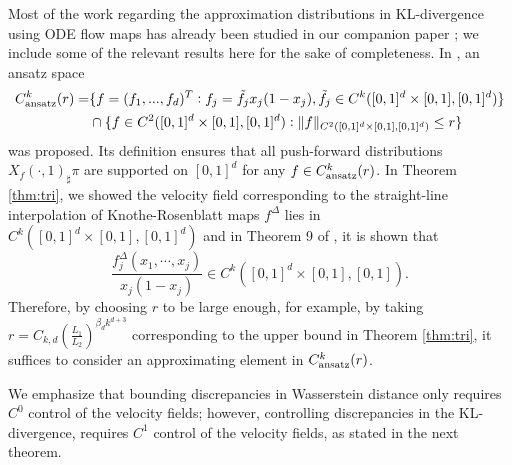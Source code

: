 Most of the work regarding the approximation distributions in KL-divergence using ODE flow maps has already been studied in our companion paper \cite{StatisticalNODE}; we include some of the relevant results here for the sake of completeness. In \cite{StatisticalNODE}, an %
ansatz space
\begin{align*}
  C^k_{\rm ansatz}(r) =  &\{f = (f_1,...,f_d)^T: f_j = \tilde{f}_jx_j(1-x_j), \tilde{f}_j\in C^k([0,1]^d\times[0,1], [0,1]^d)\} \\
  &\cap \{f\in C^2([0,1]^d\times[0,1], [0,1]^d): \|f\|_{C^2([0,1]^d\times[0,1], [0,1]^d)}\leq r\}
\end{align*}
was proposed. Its definition ensures that all push-forward distributions $X_f(\cdot,1)_\sharp\pi$ are supported on $[0,1]^d$ for any $f\in C^k_{\rm ansatz}(r)$. %
In Theorem \ref{thm:tri}, we showed the velocity field corresponding to the straight-line interpolation of Knothe-Rosenblatt maps $f^\Delta$ lies in $C^k([0,1]^d\times[0,1], [0,1]^d)$ and in Theorem 9 of \cite{StatisticalNODE}, it is shown that %
\begin{equation*}
  \frac{f^\Delta_j(x_1,\cdots,x_j)}{x_j(1-x_j)}\in C^k([0,1]^d\times[0,1], [0,1]).
\end{equation*}
  Therefore, by choosing $r$ to be large enough, for example, by taking $r= C_{k,d}(\frac{L_1}{L_2})^{\beta_dk^{d+3}}$ corresponding to the upper bound in Theorem \ref{thm:tri}, it suffices to consider an approximating element in $C^k_{\rm ansatz}(r)$.

We emphasize that bounding discrepancies in Wasserstein distance only requires $C^0$ control of the velocity fields; however, controlling discrepancies in the KL-divergence, requires $C^1$ control of the velocity fields, as stated in the next theorem.


